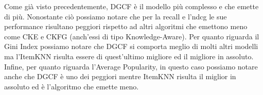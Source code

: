\noindent Come già visto precedentemente, DGCF è il modello più complesso e che emette di più. Nonostante ciò possiamo notare che per la recall e l'ndcg le sue performance risultano peggiori rispetto ad altri algoritmi che emettono meno come CKE e CKFG (anch'essi di tipo Knowledge-Aware).
Per quanto riguarda il Gini Index possiamo notare che DGCF si comporta meglio di molti altri modelli ma l'ItemKNN risulta essere di quest'ultimo migliore ed il migliore in assoluto.
Infine, per quanto riguarda l'Average Popularity, in questo caso possiamo notare anche che DGCF è uno dei peggiori mentre ItemKNN risulta il miglior in assoluto ed è l'algoritmo che emette meno.
